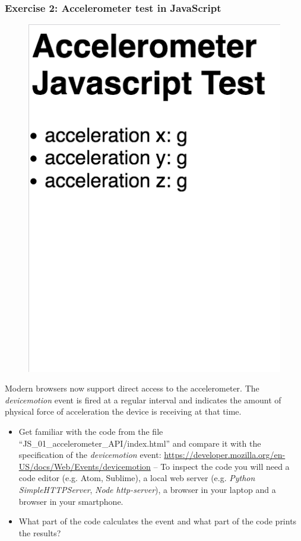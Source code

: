 \documentclass[screen, aspectratio=43]{beamer}
\begin{document}
\begin{frame}
  \frametitle{Exercise 2: Accelerometer test in JavaScript}
       \begin{figure}
	\includegraphics[scale=0.13]{img/js-accelerometer.png}
      \end{figure}
  {\scriptsize Modern browsers now support direct access to the accelerometer. The \emph{devicemotion} event is fired at a regular interval and indicates the amount of physical force of acceleration the device is receiving at that time.
    \begin{itemize}
    	\item Get familiar with the code from the file ``JS\_01\_accelerometer\_API/index.html'' and compare it with the specification of the \emph{devicemotion} event: \url{https://developer.mozilla.org/en-US/docs/Web/Events/devicemotion} -- To inspect the code you will need a code editor (e.g. Atom, Sublime), a local web server (e.g. \emph{Python SimpleHTTPServer}, \emph{Node http-server}), a browser in your laptop and a browser in your smartphone.
	\item What part of the code calculates the event and what part of the code prints the results? 
    \end{itemize}
    }
\end{frame}
\end{document}
